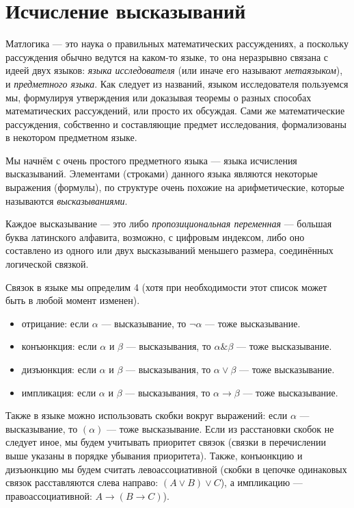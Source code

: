 \section{Исчисление высказываний}

Матлогика --- это наука о правильных математических рассуждениях, а поскольку
рассуждения обычно ведутся на каком-то языке, то она неразрывно связана с идеей
двух языков: \emph{языка исследователя} (или иначе его называют \emph{метаязыком}),
и \emph{предметного языка}. Как следует из названий, языком исследователя 
пользуемся мы, формулируя утверждения или доказывая теоремы о разных способах
математических рассуждений, или просто их обсуждая. Сами же математические рассуждения,
собственно и составляющие предмет исследования, формализованы в некотором предметном 
языке.

Мы начнём с очень простого предметного языка --- языка исчисления высказываний.
Элементами (строками) данного языка являются некоторые выражения (формулы), по структуре
очень похожие на арифметические, которые называются \emph{высказываниями}.

Каждое высказывание --- это либо \emph{пропозициональная переменная} --- 
большая буква латинского алфавита, возможно, с цифровым индексом, либо 
оно составлено из одного или двух высказываний меньшего размера, соединённых логической связкой.

Связок в языке мы определим 4 (хотя при необходимости этот список может быть
в любой момент изменен).
\begin{itemize}
\item отрицание: если $\alpha$ --- высказывание, то $\neg\alpha$ --- тоже высказывание.
\item конъюнкция: если $\alpha$ и $\beta$ --- высказывания, то $\alpha \& \beta$ --- тоже высказывание.
\item дизъюнкция: если $\alpha$ и $\beta$ --- высказывания, то $\alpha \vee \beta$ --- тоже высказывание.
\item импликация: если $\alpha$ и $\beta$ --- высказывания, то $\alpha \rightarrow \beta$ --- тоже высказывание.
\end{itemize}

Также в языке можно использовать скобки вокруг выражений:
если $\alpha$ --- высказывание, то $(\alpha)$ --- тоже высказывание.
Если из расстановки скобок не следует иное, мы будем учитывать приоритет связок
(связки в перечислении выше указаны в порядке убывания приоритета).
Также, конъюнкцию и дизъюнкцию мы будем считать левоассоциативной (скобки в цепочке
одинаковых связок расставляются слева направо: $(A \vee B) \vee C$), 
а импликацию --- правоассоциативной: $A \rightarrow (B \rightarrow C)$). 

